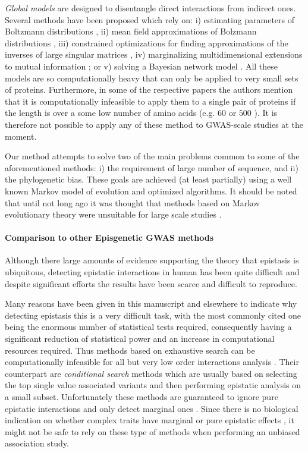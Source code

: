 \textit{Global models} are designed to disentangle direct interactions from indirect ones. 
Several methods have been proposed which rely on: 
i) estimating parameters of Boltzmann distributions \cite{lapedes2012using,weigt2009identification}, 
ii) mean field approximations of Bolzmann distributions \cite{morcos2011direct}, 
iii) constrained optimizations for finding approximations of the inverses of large singular matrices \cite{jones2012psicov}, 
iv) marginalizing multidimensional extensions to mutual information \cite{clark2014multidimensional}; or 
v) solving a Bayesian network model \cite{burger2010disentangling}. 
All these models are so computationally heavy that can only be applied to very small sets of proteins. 
Furthermore, in some of the respective papers the authors mention that it is computationally infeasible to apply them to a single pair of proteins if the length is over a some low number of amino acids (e.g. $60$ \cite{weigt2009identification} or $500$ \cite{morcos2011direct}). 
It is therefore not possible to apply any of these method to GWAS-scale studies at the moment.

Our method attempts to solve two of the main problems common to some of the aforementioned methods: i) the requirement of large number of sequence, and ii) the phylogenetic bias.
These goals are achieved (at least partially) using a well known Markov model of evolution and optimized algorithms.
It should be noted that until not long ago it was thought that methods based on Markov evolutionary theory were unsuitable for large scale studies \cite{de2013emerging}.

\paragraph{Comparison to other Episgenetic GWAS methods}
Although there large amounts of evidence supporting the theory that epistasis is ubiquitous, detecting epistatic interactions in human has been quite difficult and despite significant efforts the results have been scarce and difficult to reproduce\cite{zuk2012mystery}.

Many reasons have been given in this manuscript and elsewhere to indicate why detecting epistasis this is a very difficult task, with the most commonly cited one being the enormous number of statistical tests required, consequently having a significant reduction of statistical power and an increase in computational resources required.
Thus methods based on exhaustive search can be computationally infeasible for all but very low order interactions analysis \cite{cordell2009detecting}.
Their counterpart are \textit{conditional search} methods \cite{li2011detecting} which are usually based on selecting the top single value associated variants and then performing epistatic analysis on a small subset.
Unfortunately these methods are guaranteed to ignore pure epistatic interactions and only detect marginal ones \cite{li2011detecting,cordell2002epistasis}.
Since there is no biological indication on whether complex traits have marginal or pure epistatic effects \cite{culverhouse2002perspective,zuk2012mystery,li2011detecting}, it might not be safe to rely on these type of methods when performing an unbiased association study.

